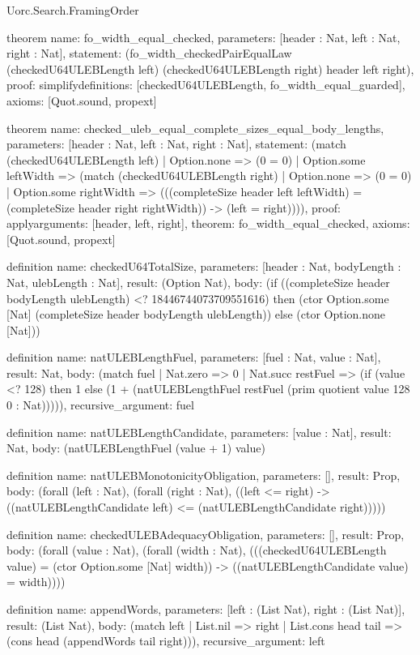 \begin{lexlean}{Uorc.Search.FramingOrder}
\begin{semanticmodule}
theorem{
  name: fo_width_equal_checked,
  parameters: [header : Nat, left : Nat, right : Nat],
  statement: (fo_width_checkedPairEqualLaw (checkedU64ULEBLength left) (checkedU64ULEBLength right) header left right),
  proof: simplify{definitions: [checkedU64ULEBLength, fo_width_equal_guarded]},
  axioms: [Quot.sound, propext]
}

theorem{
  name: checked_uleb_equal_complete_sizes_equal_body_lengths,
  parameters: [header : Nat, left : Nat, right : Nat],
  statement: (match (checkedU64ULEBLength left)
    | Option.none => (0 = 0)
    | Option.some leftWidth => (match (checkedU64ULEBLength right)
      | Option.none => (0 = 0)
      | Option.some rightWidth => (((completeSize header left leftWidth) = (completeSize header right rightWidth)) -> (left = right)))),
  proof: apply{arguments: [header, left, right], theorem: fo_width_equal_checked},
  axioms: [Quot.sound, propext]
}

definition{
  name: checkedU64TotalSize,
  parameters: [header : Nat, bodyLength : Nat, ulebLength : Nat],
  result: (Option Nat),
  body: (if ((completeSize header bodyLength ulebLength) <? 18446744073709551616) then (ctor Option.some [Nat] (completeSize header bodyLength ulebLength)) else (ctor Option.none [Nat]))
}

definition{
  name: natULEBLengthFuel,
  parameters: [fuel : Nat, value : Nat],
  result: Nat,
  body: (match fuel
    | Nat.zero => 0
    | Nat.succ restFuel => (if (value <? 128) then 1 else (1 + (natULEBLengthFuel restFuel (prim quotient value 128 0 : Nat))))),
  recursive_argument: fuel
}

definition{
  name: natULEBLengthCandidate,
  parameters: [value : Nat],
  result: Nat,
  body: (natULEBLengthFuel (value + 1) value)
}

definition{
  name: natULEBMonotonicityObligation,
  parameters: [],
  result: Prop,
  body: (forall (left : Nat), (forall (right : Nat), ((left <= right) -> ((natULEBLengthCandidate left) <= (natULEBLengthCandidate right)))))
}

definition{
  name: checkedULEBAdequacyObligation,
  parameters: [],
  result: Prop,
  body: (forall (value : Nat), (forall (width : Nat), (((checkedU64ULEBLength value) = (ctor Option.some [Nat] width)) -> ((natULEBLengthCandidate value) = width))))
}

definition{
  name: appendWords,
  parameters: [left : (List Nat), right : (List Nat)],
  result: (List Nat),
  body: (match left
    | List.nil => right
    | List.cons head tail => (cons head (appendWords tail right))),
  recursive_argument: left
}


\end{semanticmodule}
\end{lexlean}
